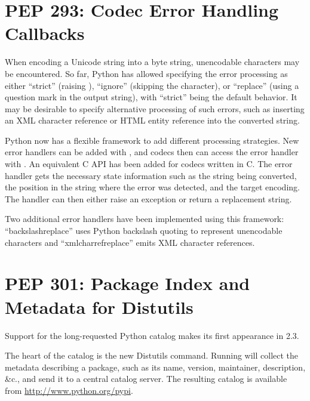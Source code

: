 \documentclass{howto}
\begin{document}
\section{PEP 293: Codec Error Handling Callbacks}

When encoding a Unicode string into a byte string, unencodable
characters may be encountered.  So far, Python has allowed specifying
the error processing as either ``strict'' (raising
), ``ignore'' (skipping the character), or
``replace'' (using a question mark in the output string), with
``strict'' being the default behavior. It may be desirable to specify
alternative processing of such errors, such as inserting an XML
character reference or HTML entity reference into the converted
string.

Python now has a flexible framework to add different processing
strategies.  New error handlers can be added with
, and codecs then can access the error
handler with . An equivalent C API has
been added for codecs written in C. The error handler gets the
necessary state information such as the string being converted, the
position in the string where the error was detected, and the target
encoding.  The handler can then either raise an exception or return a
replacement string.

Two additional error handlers have been implemented using this
framework: ``backslashreplace'' uses Python backslash quoting to
represent unencodable characters and ``xmlcharrefreplace'' emits
XML character references.

\begin{seealso}


\end{seealso}


\section{PEP 301: Package Index and Metadata for
Distutils\label{section-pep301}}

Support for the long-requested Python catalog makes its first
appearance in 2.3.

The heart of the catalog is the new Distutils  command.
Running  will collect the metadata
describing a package, such as its name, version, maintainer,
description, \&c., and send it to a central catalog server.  The
resulting catalog is available from \url{http://www.python.org/pypi}.
\end{document}
